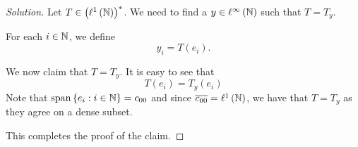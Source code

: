 \begin{proof}[Solution]
Let $T \in \left( \ell ^{1} \left( \mathbb N \right) \right)^{*}$. We need to find a $y \in \ell ^{\infty} \left( \mathbb N \right)$ such that $T=T_{y}$.

For each $i \in \mathbb N$, we define
\begin{equation*}
    y_{i} = T\left( e_{i} \right).
\end{equation*}

We now claim that $T=T_{y}$. It is easy to see that 
\begin{equation*}
    T\left( e_{i} \right) = T_{y} \left( e_{i} \right)
\end{equation*}
Note that $\operatorname{span} \left\{ e_{i} : i \in \mathbb N \right\} = c_{00}$ and since $\overline{c_{00}} = \ell ^{1} \left( \mathbb N \right)$, we have that $T=T_{y}$ as they agree on a dense subset.

This completes the proof of the claim.
\end{proof}
